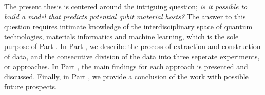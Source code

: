 
The present thesis is centered around the intriguing question; \textit{is it possible to build a model that predicts potential qubit material hosts?} The answer to this question requires intimate knowledge of the interdisciplinary space of quantum technologies, materials informatics and machine learning, which is the sole purpose of Part . In Part , we describe the process of extraction and construction of data, and the consecutive division of the data into three seperate experiments, or approaches. In Part , the main findings for each approach is presented and discussed. Finally, in Part , we provide a conclusion of the work with possible future prospects.







